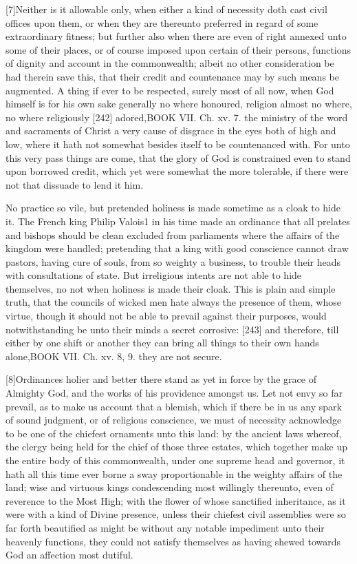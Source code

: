 [7]Neither is it allowable only, when either a kind of necessity doth cast civil offices upon them, or when they are thereunto preferred in regard of some extraordinary fitness; but further also when there are even of right annexed unto some of their places, or of course imposed upon certain of their persons, functions of dignity and account in the commonwealth; albeit no other consideration be had therein save this, that their credit and countenance may by such means be augmented. A thing if ever to be respected, surely most of all now, when God himself is for his own sake generally no where honoured, religion almost no where, no where religiously [242] adored,BOOK VII. Ch. xv. 7. the ministry of the word and sacraments of Christ a very cause of disgrace in the eyes both of high and low, where it hath not somewhat besides itself to be countenanced with. For unto this very pass things are come, that the glory of God is constrained even to stand upon borrowed credit, which yet were somewhat the more tolerable, if there were not that dissuade to lend it him.

No practice so vile, but pretended holiness is made sometime as a cloak to hide it. The French king Philip Valois1 in his time made an ordinance that all prelates and bishops should be clean excluded from parliaments where the affairs of the kingdom were handled; pretending that a king with good conscience cannot draw pastors, having cure of souls, from so weighty a business, to trouble their heads with consultations of state. But irreligious intents are not able to hide themselves, no not when holiness is made their cloak. This is plain and simple truth, that the councils of wicked men hate always the presence of them, whose virtue, though it should not be able to prevail against their purposes, would notwithstanding be unto their minds a secret corrosive: [243] and therefore, till either by one shift or another they can bring all things to their own hands alone,BOOK VII. Ch. xv. 8, 9. they are not secure.

[8]Ordinances holier and better there stand as yet in force by the grace of Almighty God, and the works of his providence amongst us. Let not envy so far prevail, as to make us account that a blemish, which if there be in us any spark of sound judgment, or of religious conscience, we must of necessity acknowledge to be one of the chiefest ornaments unto this land: by the ancient laws whereof, the clergy being held for the chief of those three estates, which together make up the entire body of this commonwealth, under one supreme head and governor, it hath all this time ever borne a sway proportionable in the weighty affairs of the land; wise and virtuous kings condescending most willingly thereunto, even of reverence to the Most High; with the flower of whose sanctified inheritance, as it were with a kind of Divine presence, unless their chiefest civil assemblies were so far forth beautified as might be without any notable impediment unto their heavenly functions, they could not satisfy themselves as having shewed towards God an affection most dutiful.

